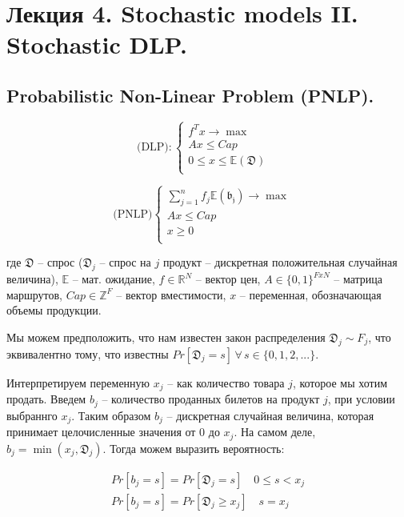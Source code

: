 \documentclass[reqno]{article}
\theoremstyle{definition}
\theoremstyle{definition}
\theoremstyle{definition}
\theoremstyle{definition}
\theoremstyle{definition}
\theoremstyle{definition}
\theoremstyle{definition}
\theoremstyle{definition}
\theoremstyle{definition}
\begin{document}
	
	\newpage
	\section{Лекция 4. Stochastic models II. Stochastic DLP.}
			
		\subsection{Probabilistic Non-Linear Problem (PNLP).}
		
		\begin{multicols}{2}
			$$
			\text{(DLP)}:
			\begin{cases}
				f^Tx \rightarrow \max & \\
				Ax \leq Cap & \\
				0 \leq x \leq \mathds{E}(\mathfrak{D}) & \\
			\end{cases}	
			$$
			
			\columnbreak
			
			$$
			\text{(PNLP)}
			\begin{cases}
				\sum\limits_{j=1}^n f_j \mathds{E}(\mathfrak{b_j}) \rightarrow \max & \\
				Ax \leq Cap & \\
				x \geq 0 & \\
			\end{cases}
			$$
		\end{multicols}
		
		где $\mathfrak{D}$ -- спрос ($\mathfrak{D}_j$ -- спрос на $j$ продукт -- дискретная положительная случайная величина), $\mathds{E}$ -- мат. ожидание, $f \in \mathds{R}^N$ -- вектор цен, $A \in \{0, 1\}^{F x N}$ -- матрица маршрутов, $Cap \in \mathds{Z}^F$ -- вектор вместимости, $x$ -- переменная, обозначающая объемы продукции.
		
		Мы можем предположить, что нам известен закон распределения $\mathfrak{D}_j \sim F_j$, что эквивалентно тому, что известны $Pr[\mathfrak{D}_j = s]\,\forall\,s \in \{0, 1, 2, ...\}$.
		
		Интерпретируем переменную $x_j$ -- как количество товара $j$, которое мы хотим продать. Введем $b_j$ -- количество проданных билетов на продукт $j$, при условии выбраннго $x_j$. Таким образом $b_j$ -- дискретная случайная величина, которая принимает целочисленные значения от $0$ до $x_j$. На самом деле, $b_j = \min(x_j, \mathfrak{D}_j)$. Тогда можем выразить вероятность:
		
		$$
		\begin{array}{l}
			Pr[b_j = s] = Pr[\mathfrak{D}_j = s]\quad 0 \leq s < x_j \\
			Pr[b_j = s] = Pr[\mathfrak{D}_j \geq x_j]\quad s = x_j
		\end{array}
		$$
		
\end{document}
